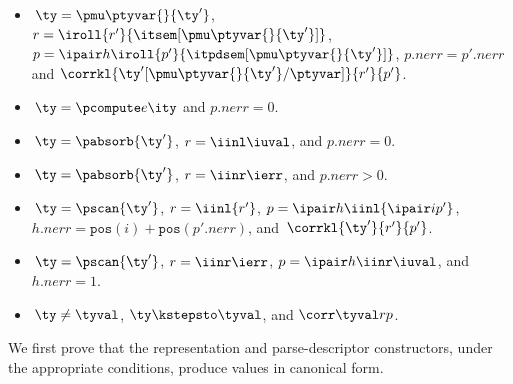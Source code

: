\begin{definition}
\begin{itemize}
  \item $\,\ty = \pmu \ptyvar {} {\ty'}$, 
    $r = \iroll{r'}{\itsem[\pmu \ptyvar {} {\ty'}]}$, $p =
    \ipair h {\iroll{p'}{
                \itpdsem[\pmu \ptyvar {} {\ty'}]}}$, 
        $p.{nerr} = p'.{nerr}$ 
    and 
    $\corrkl {\ty'[\pmu \ptyvar {} {\ty'}/\ptyvar]} {r'} {p'}$.
  \item $\,\ty = \pcompute e \ity$ and $p.{nerr} = 0$.
  \item $\,\ty = \pabsorb {\ty'}$, $r = \iinl \iuval$, and $p.nerr = 0$.
  \item $\,\ty = \pabsorb {\ty'}$, $r = \iinr \ierr$, and $p.nerr > 0$.
  \item $\,\ty = \pscan {\ty'}$, $r =\iinl {r'}$,
      $p = \ipair h {\iinl {\ipair i {p'}}}$,
      $h.nerr = \mathtt{pos}(i) + \mathtt{pos}(p'.nerr)$, and \linebreak
      $\, \corrkl {\ty'}{r'}{p'}$.
  \item $\,\ty = \pscan {\ty'}$,
      $r =\iinr \ierr$,
      $p = \ipair h {\iinr \iuval}$, and
      $h.{nerr} = 1$.
  \item $\,\ty \not = \tyval$, $\ty \kstepsto \tyval$, and $\corr \tyval r p$.
  \end{itemize}
\end{definition}

We first prove that the representation and parse-descriptor constructors, under the appropriate
conditions, produce values in canonical form.

